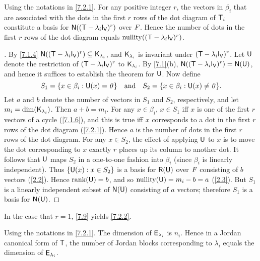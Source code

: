 \begin{thm}\label{7.9}
  Using the notations in \cref{7.2.1}.
  For any positive integer \(r\), the vectors in \(\beta_i\) that are associated with the dots in the first \(r\) rows of the dot diagram of \(\mathsf{T}_i\) constitute a basis for \(\ns{(\T - \lambda_i \IT[\V])^r}\) over \(\mathit{F}\).
  Hence the number of dots in the first \(r\) rows of the dot diagram equals \(\nt{(\T - \lambda_i \IT[\V])^r}\).
\end{thm}

\begin{proof}[]
  By \cref{7.1.4} \(\ns{(\T - \lambda_i \IT[\V])^r} \subseteq \vs{K}_{\lambda_i}\), and \(\mathsf{K}_{\lambda_i}\) is invariant under \((\T - \lambda_i \IT[\V])^r\).
  Let \(\mathsf{U}\) denote the restriction of \((\T - \lambda_i \IT[\V])^r\) to \(\mathsf{K}_{\lambda_i}\).
  By \cref{7.1}(b), \(\ns{(\T - \lambda_i \IT[\V])^r} = \ns{\U}\), and hence it suffices to establish the theorem for \(\mathsf{U}\).
  Now define
  \[
    S_1 = \set{x \in \beta_i : \U(x) = \zv} \quad \text{and} \quad S_2 = \set{x \in \beta_i : \U(x) \neq \zv}.
  \]
  Let \(a\) and \(b\) denote the number of vectors in \(S_1\) and \(S_2\), respectively, and let \(m_i = \dim(\mathsf{K}_{\lambda_i})\).
  Then \(a + b = m_i\).
  For any \(x \in \beta_i\), \(x \in S_1\) iff \(x\) is one of the first \(r\) vectors of a cycle (\cref{7.1.6}), and this is true iff \(x\) corresponds to a dot in the first \(r\) rows of the dot diagram (\cref{7.2.1}).
  Hence \(a\) is the number of dots in the first \(r\) rows of the dot diagram.
  For any \(x \in S_2\), the effect of applying \(\mathsf{U}\) to \(x\) is to move the dot corresponding to \(x\) exactly \(r\) places up its column to another dot.
  It follows that \(\mathsf{U}\) maps \(S_2\) in a one-to-one fashion into \(\beta_i\) (since \(\beta_i\) is linearly independent).
  Thus \(\left\lbrace\mathsf{U}(x) : x \in S_2\right\rbrace\) is a basis for \(\rg{\U}\) over \(\mathit{F}\) consisting of \(b\) vectors (\cref{2.2}).
  Hence \(\rk{\U} = b\), and so \(\nt{\U} = m_i - b = a\) (\cref{2.3}).
  But \(S_1\) is a linearly independent subset of \(\ns{\U}\) consisting of \(a\) vectors;
  therefore \(S_1\) is a basis for \(\ns{\U}\).
\end{proof}

\begin{note}
  In the case that \(r = 1\), \cref{7.9} yields \cref{7.2.2}.
\end{note}

\begin{cor}\label{7.2.2}
  Using the notations in \cref{7.2.1}.
  The dimension of \(\mathsf{E}_{\lambda_i}\) is \(n_i\).
  Hence in a Jordan canonical form of \(\mathsf{T}\), the number of Jordan blocks corresponding to \(\lambda_i\) equals the dimension of \(\mathsf{E}_{\lambda_i}\).
\end{cor}

